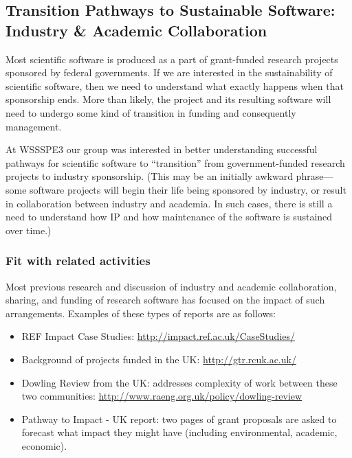 
\subsection{Transition Pathways to Sustainable Software: Industry \& Academic Collaboration}
\label{sec:industry_interaction}


Most scientific software is produced as a part of grant-funded research projects
sponsored by federal governments. If we are interested in the sustainability of
scientific software, then we need to understand what exactly happens when that
sponsorship ends. More than likely, the project and its resulting software will
need to undergo some kind of transition in funding and consequently management.

At WSSSPE3 our group was interested in better understanding successful pathways
for scientific software to ``transition'' from government-funded research
projects to industry sponsorship. (This may be an initially awkward
phrase---some software projects will begin their life being sponsored by
industry, or result in collaboration between industry and academia. In such
cases, there is still a need to understand how IP and how maintenance of the
software is sustained over time.)

\subsubsection{Fit with related activities}

Most previous research and discussion of industry and academic collaboration, sharing, and funding of research software has focused on the impact of such arrangements. Examples of these types of reports are as follows:

\begin{itemize}
\item REF Impact Case Studies: \url{http://impact.ref.ac.uk/CaseStudies/}
\item Background of projects funded in the UK: \url{http://gtr.rcuk.ac.uk/}
\item Dowling Review from the UK: addresses complexity of work between these two
communities: \url{http://www.raeng.org.uk/policy/dowling-review}
\item Pathway to Impact - UK report: two pages of grant proposals are asked to
forecast what impact they might have (including environmental, academic, economic).
\end{itemize}

